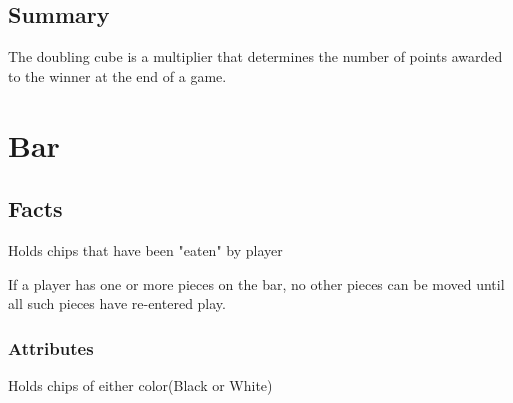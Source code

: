 \documentclass{report}
\begin{document}
    \subsection{Summary}
    The doubling cube is a multiplier that determines the number of points awarded
    to the winner at the end of a game.



\section{Bar}

\subsection{Facts}
\begin{dashed}
	\item Holds chips that have been "eaten" by player
	\item If a player has one or more pieces on the bar,
	 no other pieces can be moved until all such pieces
	 have re-entered play.
\end{dashed}

\subsubsection{Attributes}
\begin{dashed}
	\item Holds chips of either color(Black or White)
\end{dashed}
\end{document}
